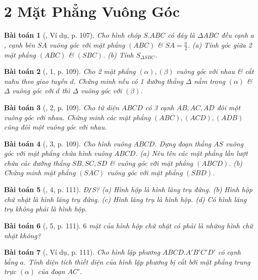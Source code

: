 \documentclass{article}
\numberwithin{equation}{section}
\newtheorem{baitoan}{Bài toán}
\begin{document}
\section{2 Mặt Phẳng Vuông Góc}

\begin{baitoan}[\cite{SGK_Toan_11_hinh_hoc_co_ban}, Ví dụ, p. 107]
	Cho hình chóp $S.ABC$ có đáy là $\Delta ABC$ đều cạnh $a$, cạnh bên $SA$ vuông góc với mặt phẳng $(ABC)$ \& $SA = \frac{a}{2}$. (a) Tính góc giữa 2 mặt phẳng $(ABC)$ \& $(SBC)$. (b) Tính $S_{\Delta SBC}$.
\end{baitoan}

\begin{baitoan}[\cite{SGK_Toan_11_hinh_hoc_co_ban}, 1, p. 109]
	Cho 2 mặt phẳng $(\alpha),(\beta)$ vuông góc với nhau \& cắt nahu theo giao tuyến $d$. Chứng minh nếu có 1 đường thẳng $\Delta$ nằm trong $(\alpha)$ \& $\Delta$ vuông góc với $d$ thì $\Delta$ vuông góc với $(\beta)$.
\end{baitoan}

\begin{baitoan}[\cite{SGK_Toan_11_hinh_hoc_co_ban}, 2, p. 109]
	Cho tứ diện $ABCD$ có 3 cạnh $AB,AC,AD$ đôi một vuông góc với nhau. Chứng minh các mặt phẳng $(ABC),(ACD),(ADB)$ cũng đôi một vuông góc với nhau.
\end{baitoan}

\begin{baitoan}[\cite{SGK_Toan_11_hinh_hoc_co_ban}, 3, p. 109]
	Cho hình vuông $ABCD$. Dựng đoạn thẳng $AS$ vuông góc với mặt phẳng chứa hình vuông $ABCD$. (a) Nêu tên các mặt phẳng lần lượt chứa các đường thẳng $SB,SC,SD$ \& vuông góc với mặt phẳng $(ABCD)$. (b) Chứng minh mặt phẳng $(SAC)$ vuông góc với mặt phẳng $(SBD)$.
\end{baitoan}

\begin{baitoan}[\cite{SGK_Toan_11_hinh_hoc_co_ban}, 4, p. 111]
	\emph{Đ\texttt{/}S?} (a) Hình hộp là hình lăng trụ đứng. (b) Hình hộp chữ nhật là hình lăng trụ đứng. (c) Hình lăng trụ là hình hộp. (d) Có hình lăng trụ không phải là hình hộp.
\end{baitoan}

\begin{baitoan}[\cite{SGK_Toan_11_hinh_hoc_co_ban}, 5, p. 111]
	$6$ mặt của hình hộp chữ nhật có phải là những hình chữ nhật không?
\end{baitoan}

\begin{baitoan}[\cite{SGK_Toan_11_hinh_hoc_co_ban}, Ví dụ, p. 111]
	Cho hình lập phương $ABCD.A'B'C'D'$ có cạnh bằng $a$. Tính diện tích thiết diện của hình lập phương bị cắt bởi mặt phẳng trung trực $(\alpha)$ của đoạn $AC'$.
\end{baitoan}
\end{document}
